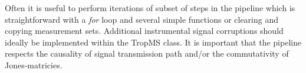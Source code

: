Often it is useful to perform iterations of subset of steps in the pipeline which is straightforward with a \emph{for} loop and several simple functions or clearing and copying measurement sets. Additional instrumental signal corruptions should ideally be implemented within the TropMS class. It is important that the pipeline respects the causality of signal transmission path and/or the commutativity of Jones-matricies.


















